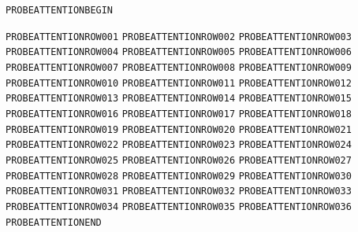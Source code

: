 \clearpage
\begin{AttentionBox}
\texttt{PROBEATTENTIONBEGIN}\par
\texttt{PROBEATTENTIONROW001}\quad\EditorialProbeParagraph
\texttt{PROBEATTENTIONROW002}\quad\EditorialProbeParagraph
\texttt{PROBEATTENTIONROW003}\quad\EditorialProbeParagraph
\texttt{PROBEATTENTIONROW004}\quad\EditorialProbeParagraph
\texttt{PROBEATTENTIONROW005}\quad\EditorialProbeParagraph
\texttt{PROBEATTENTIONROW006}\quad\EditorialProbeParagraph
\texttt{PROBEATTENTIONROW007}\quad\EditorialProbeParagraph
\texttt{PROBEATTENTIONROW008}\quad\EditorialProbeParagraph
\texttt{PROBEATTENTIONROW009}\quad\EditorialProbeParagraph
\texttt{PROBEATTENTIONROW010}\quad\EditorialProbeParagraph
\texttt{PROBEATTENTIONROW011}\quad\EditorialProbeParagraph
\texttt{PROBEATTENTIONROW012}\quad\EditorialProbeParagraph
\texttt{PROBEATTENTIONROW013}\quad\EditorialProbeParagraph
\texttt{PROBEATTENTIONROW014}\quad\EditorialProbeParagraph
\texttt{PROBEATTENTIONROW015}\quad\EditorialProbeParagraph
\texttt{PROBEATTENTIONROW016}\quad\EditorialProbeParagraph
\texttt{PROBEATTENTIONROW017}\quad\EditorialProbeParagraph
\texttt{PROBEATTENTIONROW018}\quad\EditorialProbeParagraph
\texttt{PROBEATTENTIONROW019}\quad\EditorialProbeParagraph
\texttt{PROBEATTENTIONROW020}\quad\EditorialProbeParagraph
\texttt{PROBEATTENTIONROW021}\quad\EditorialProbeParagraph
\texttt{PROBEATTENTIONROW022}\quad\EditorialProbeParagraph
\texttt{PROBEATTENTIONROW023}\quad\EditorialProbeParagraph
\texttt{PROBEATTENTIONROW024}\quad\EditorialProbeParagraph
\texttt{PROBEATTENTIONROW025}\quad\EditorialProbeParagraph
\texttt{PROBEATTENTIONROW026}\quad\EditorialProbeParagraph
\texttt{PROBEATTENTIONROW027}\quad\EditorialProbeParagraph
\texttt{PROBEATTENTIONROW028}\quad\EditorialProbeParagraph
\texttt{PROBEATTENTIONROW029}\quad\EditorialProbeParagraph
\texttt{PROBEATTENTIONROW030}\quad\EditorialProbeParagraph
\texttt{PROBEATTENTIONROW031}\quad\EditorialProbeParagraph
\texttt{PROBEATTENTIONROW032}\quad\EditorialProbeParagraph
\texttt{PROBEATTENTIONROW033}\quad\EditorialProbeParagraph
\texttt{PROBEATTENTIONROW034}\quad\EditorialProbeParagraph
\texttt{PROBEATTENTIONROW035}\quad\EditorialProbeParagraph
\texttt{PROBEATTENTIONROW036}\quad\EditorialProbeParagraph
\texttt{PROBEATTENTIONEND}
\end{AttentionBox}
\clearpage
